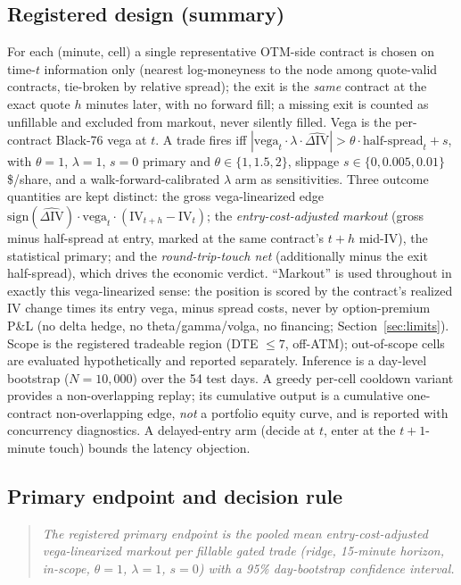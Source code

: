 \documentclass[11pt]{article}
\newcommand{\dIV}{\Delta\mathrm{IV}}
\begin{document}
\subsection{Registered design (summary)}

For each (minute, cell) a single representative OTM-side contract is chosen
on time-$t$ information only (nearest log-moneyness to the node among
quote-valid contracts, tie-broken by relative spread); the exit is the
\emph{same} contract at the exact quote $h$ minutes later, with no forward
fill; a missing exit is counted as unfillable and excluded from markout,
never silently filled. Vega is the per-contract Black-76 vega at $t$. A
trade fires iff $|\text{vega}_t \cdot \lambda \cdot \widehat{\dIV}| >
\theta \cdot \text{half-spread}_t + s$, with $\theta = 1$, $\lambda = 1$,
$s = 0$ primary and $\theta \in \{1, 1.5, 2\}$, slippage
$s \in \{0, 0.005, 0.01\}$ \$/share, and a walk-forward-calibrated
$\lambda$ arm as sensitivities. Three outcome quantities are kept distinct:
the gross vega-linearized edge
$\mathrm{sign}(\widehat{\dIV})\cdot\text{vega}_t\cdot(\mathrm{IV}_{t+h} -
\mathrm{IV}_t)$; the \emph{entry-cost-adjusted markout} (gross minus
half-spread at entry, marked at the same contract's $t{+}h$ mid-IV), the
statistical primary;
and the \emph{round-trip-touch net} (additionally minus the exit
half-spread), which drives the economic verdict. ``Markout'' is used
throughout in exactly this vega-linearized sense: the position is scored by
the contract's realized IV change times its entry vega, minus spread costs,
never by option-premium P\&L (no delta hedge, no theta/gamma/volga, no
financing; Section~\ref{sec:limits}). Scope is the registered
tradeable region (DTE $\leq 7$, off-ATM); out-of-scope cells are evaluated
hypothetically and reported separately. Inference is a day-level bootstrap
($N = 10{,}000$) over the 54 test days. A greedy per-cell cooldown variant
provides a non-overlapping replay; its cumulative output is a cumulative
one-contract non-overlapping edge, \emph{not} a portfolio equity curve, and
is reported with concurrency diagnostics. A delayed-entry arm (decide at
$t$, enter at the $t{+}1$-minute touch) bounds the latency objection.

\subsection{Primary endpoint and decision rule}

\begin{quote}
\itshape The registered primary endpoint is the pooled mean
entry-cost-adjusted vega-linearized markout per fillable gated trade (ridge, 15-minute horizon, in-scope, $\theta = 1$, $\lambda = 1$, $s = 0$) with a 95\% day-bootstrap confidence interval.
\end{quote}
\end{document}
